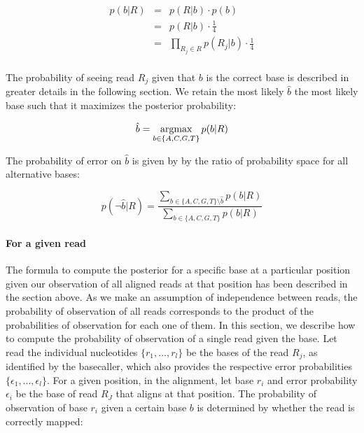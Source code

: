 \documentclass[a4paper,12pt]{article}
\newcommand{\argmax}{\operatornamewithlimits{argmax}}
\begin{document}
\begin{eqnarray}
  p(b|R)   & = & p(R|b) \cdot p(b)  \\
  & = & p(R|b) \cdot \frac {1} {4} \\
  & = & \prod_{R_j \in R} p(R_j|b) \cdot \frac {1} {4} \\
\label{eqn:idenp}
\end{eqnarray} 


\noindent The probability of seeing read $R_j$ given that $b$ is the correct base is described in greater details in the following section.  We retain the most likely $\hat{b}$ the most likely base such that it maximizes the posterior probability:

\begin{equation}
\hat{b} = \argmax_{b \in \{A,C,G,T\} }   p(b|R)
\end{equation} 


\noindent  The probability of error on $\hat{b}$ is given by by the ratio of probability space for all alternative bases:

\begin{equation}
p(\neg \hat{b}|R) = \frac { \sum\limits_{ b \in \{A,C,G,T\}  \setminus \hat{b} } p(b|R) } { \sum\limits_{ b \in \{A,C,G,T\}  } p(b|R) }
\label{eqn:errormt}
\end{equation}














 
\paragraph{For a given read}
\label{sec:forgivenread}

\noindent The formula to compute the posterior for a specific base at a particular position given our observation of all aligned reads at that position has been described in the section above. As we make an assumption of independence between reads, the probability of observation of all reads corresponds to the product of the probabilities of observation for each one of them. In this section, we describe how to compute the probability of observation of a single read given the base. Let read the individual nucleotides $\{ r_1, ..., r_l \}$ be the bases of the read $R_j$, as identified by the basecaller, which also provides the respective error probabilities $\{ \epsilon_1, ..., \epsilon_l \}$. For a given position, in the alignment, let base $r_i$ and error probability $\epsilon_i$ be the base of read $R_J$ that aligns at that position. The probability of observation of base $r_i$ given a certain base $b$ is determined by whether the read is correctly mapped:
\end{document}

